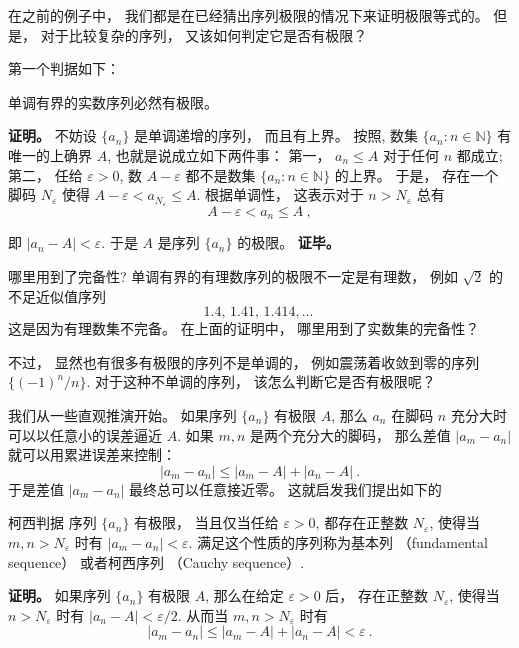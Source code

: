

在之前的例子中， 我们都是在已经猜出序列极限的情况下来证明极限等式的。 但是， 对于比较复杂的序列， 又该如何判定它是否有极限？

第一个判据如下：

\begin{theorem}{}
单调有界的实数序列必然有极限。
\end{theorem}
\textbf{证明。} 不妨设 $\{a_n\}$ 是单调递增的序列， 而且有上界。 按照, 数集 $\{a_n:n\in\mathbb{N}\}$ 有唯一的上确界 $A$, 也就是说成立如下两件事： 第一， $a_n\leq A$ 对于任何 $n$ 都成立; 第二， 任给 $\varepsilon>0$, 数 $A-\varepsilon$ 都不是数集 $\{a_n:n\in\mathbb{N}\}$ 的上界。 于是， 存在一个脚码 $N_\varepsilon$ 使得 $A-\varepsilon<a_{N_\varepsilon}\leq A$. 根据单调性， 这表示对于 $n>N_\varepsilon$ 总有
\begin{equation}
A-\varepsilon<a_n\leq A~,
\end{equation}




即 $|a_n-A|<\varepsilon$. 于是 $A$ 是序列 $\{a_n\}$ 的极限。 \textbf{证毕。}

\begin{exercise}{哪里用到了完备性?}
单调有界的有理数序列的极限不一定是有理数， 例如 $\sqrt{2}$ 的不足近似值序列
$$
1.4,\,1.41,\,1.414,...~
$$
这是因为有理数集不完备。 在上面的证明中， 哪里用到了实数集的完备性？
\end{exercise}

不过， 显然也有很多有极限的序列不是单调的， 例如震荡着收敛到零的序列 $\{(-1)^n/n\}$. 对于这种不单调的序列， 该怎么判断它是否有极限呢？

我们从一些直观推演开始。 如果序列 $\{a_n\}$ 有极限 $A$, 那么 $a_n$ 在脚码 $n$ 充分大时可以以任意小的误差逼近 $A$. 如果 $m,n$ 是两个充分大的脚码， 那么差值 $|a_m-a_n|$ 就可以用累进误差来控制：
$$
|a_m-a_n|\leq |a_m-A|+|a_n-A|~.
$$
于是差值 $|a_m-a_n|$ 最终总可以任意接近零。 这就启发我们提出如下的

\begin{theorem}{柯西判据}\label{the_CauSeq_1}
序列 $\{a_n\}$ 有极限， 当且仅当任给 $\varepsilon>0$, 都存在正整数 $N_\varepsilon$, 使得当 $m,n>N_\varepsilon$ 时有 $|a_m-a_n|<\varepsilon$. 满足这个性质的序列称为基本列 （fundamental sequence） 或者柯西序列 （Cauchy sequence）.
\end{theorem}

\textbf{证明。} 如果序列 $\{a_n\}$ 有极限 $A$, 那么在给定 $\varepsilon>0$ 后， 存在正整数 $N_\varepsilon$, 使得当 $n>N_\varepsilon$ 时有 $|a_n-A|<\varepsilon/2$. 从而当 $m,n>N_\varepsilon$ 时有
$$
|a_m-a_n|\leq|a_m-A|+|a_n-A|<\varepsilon~.
$$



